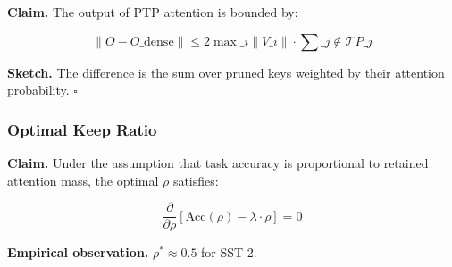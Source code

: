 \textbf{Claim.} The output of PTP attention is bounded by:

\[
\|O - O\_\text{dense}\| \leq 2 \max\_i \|V\_i\| \cdot \sum\_{j \notin \mathcal{T}} P\_j
\tag{4.9}
\]

\textbf{Sketch.} The difference is the sum over pruned keys weighted by their 
attention probability. $\square$

\subsubsection{Optimal Keep Ratio}

\textbf{Claim.} Under the assumption that task accuracy is proportional to 
retained attention mass, the optimal $\rho$ satisfies:

\[
\frac{\partial}{\partial \rho} \left[\text{Acc}(\rho) - \lambda \cdot \rho\right] = 0
\tag{4.10}
\]

\textbf{Empirical observation.} $\rho^* \approx 0.5$ for SST-2.

